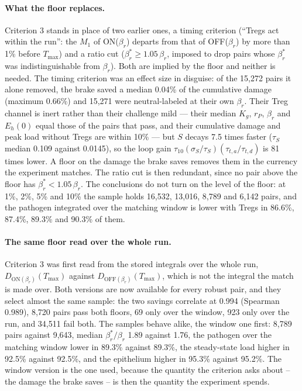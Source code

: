 \documentclass[11pt]{article}
\begin{document}
\paragraph{What the floor replaces.} Criterion 3 stands in place of two earlier ones, a timing
criterion (``Tregs act within the run'': the $M_1$ of ON($\beta_r$) departs from that of
OFF($\beta_r$) by more than 1\% before $T_{\max}$) and a ratio cut ($\beta_r^{*} \ge 1.05\,\beta_r$,
imposed to drop pairs whose $\beta_r^{*}$ was indistinguishable from $\beta_r$). Both are implied by
the floor and neither is needed. The timing criterion was an effect size in disguise: of the
15{,}272 pairs it alone removed, the brake saved a median 0.04\% of the cumulative damage
(maximum 0.66\%) and 15{,}271 were neutral-labeled at their own $\beta_r$. Their Treg channel is
inert rather than their challenge mild --- their median $K_g$, $r_P$, $\beta_r$ and $E_h(0)$ equal
those of the pairs that pass, and their cumulative damage and peak load without Tregs are within
10\% --- but $S$ decays 7.5 times faster ($\tau_S$ median 0.109 against 0.0145), so the loop gain
$\tau_{10}(\sigma_S/\tau_S)(\tau_{t,a}/\tau_{t,d})$ is 81 times lower. A floor on the damage the
brake saves removes them in the currency the experiment matches. The ratio cut is then redundant,
since no pair above the floor has $\beta_r^{*} < 1.05\,\beta_r$. The conclusions do not turn on the
level of the floor: at 1\%, 2\%, 5\% and 10\% the sample holds 16{,}532, 13{,}016, 8{,}789 and
6{,}142 pairs, and the pathogen integrated over the matching window is lower with Tregs in
86.6\%, 87.4\%, 89.3\% and 90.3\% of them.

\paragraph{The same floor read over the whole run.} Criterion 3 was first read from the stored
integrals over the whole run, $D_{\mathrm{ON}(\beta_r)}(T_{\max})$ against
$D_{\mathrm{OFF}(\beta_r)}(T_{\max})$, which is not the integral the match is made over. Both
versions are now available for every robust pair, and they select almost the same sample: the two
savings correlate at 0.994 (Spearman 0.989), 8{,}720 pairs pass both floors, 69 only over the
window, 923 only over the run, and 34{,}511 fail both. The samples behave alike, the window one
first: 8{,}789 pairs against 9{,}643, median $\beta_r^{*}/\beta_r$ 1.89 against 1.76, the pathogen
over the matching window lower in 89.3\% against 89.3\%, the steady-state load higher in 92.5\%
against 92.5\%, and the epithelium higher in 95.3\% against 95.2\%. The window version is the one
used, because the quantity the criterion asks about -- the damage the brake saves -- is then the
quantity the experiment spends.
\end{document}
